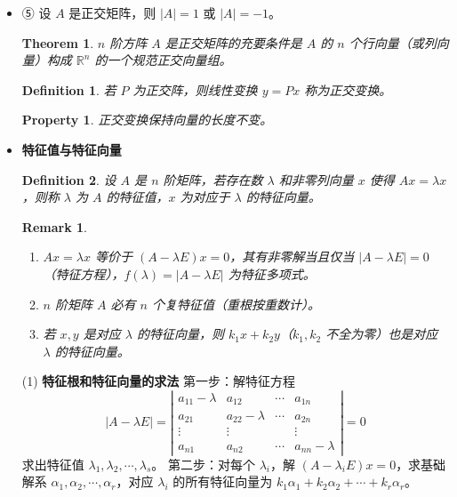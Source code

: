 \documentclass[UTF8]{ctexart}
\newtheorem{theorem}{Theorem}
\newtheorem{definition}{Definition}
\newtheorem{property}{Property}
\newtheorem{remark}{Remark}
\begin{document}
	
	\begin{itemize}
		\item ⑤ 设 \(A\) 是正交矩阵，则 \(|A| = 1\) 或 \(|A| = -1\)。  
		\begin{theorem}
			\(n\) 阶方阵 \(A\) 是正交矩阵的充要条件是 \(A\) 的 \(n\) 个行向量（或列向量）构成 \(\mathbb{R}^n\) 的一个规范正交向量组。
		\end{theorem}
		\begin{definition}
			若 \(P\) 为正交阵，则线性变换 \(y = Px\) 称为正交变换。
		\end{definition}
		\begin{property}
			正交变换保持向量的长度不变。
		\end{property}
		
		\item \textbf{特征值与特征向量}
		\begin{definition}
			设 \(A\) 是 \(n\) 阶矩阵，若存在数 \(\lambda\) 和非零列向量 \(x\) 使得 \(Ax = \lambda x\)，则称 \(\lambda\) 为 \(A\) 的特征值，\(x\) 为对应于 \(\lambda\) 的特征向量。
		\end{definition}
		\begin{remark}
			\begin{enumerate}
				\item \(Ax = \lambda x\) 等价于 \((A - \lambda E)x = 0\)，其有非零解当且仅当 \(|A - \lambda E| = 0\)（特征方程），\(f(\lambda) = |A - \lambda E|\) 为特征多项式。
				\item \(n\) 阶矩阵 \(A\) 必有 \(n\) 个复特征值（重根按重数计）。
				\item 若 \(x, y\) 是对应 \(\lambda\) 的特征向量，则 \(k_1x + k_2y\)（\(k_1, k_2\) 不全为零）也是对应 \(\lambda\) 的特征向量。
			\end{enumerate}
		\end{remark}
		
		(1) \textbf{特征根和特征向量的求法}  
		第一步：解特征方程  
		\[
		|A - \lambda E| = \left|\begin{array}{cccc}
			a_{11} - \lambda & a_{12} & \cdots & a_{1n} \\
			a_{21} & a_{22} - \lambda & \cdots & a_{2n} \\
			\vdots & \vdots & & \vdots \\
			a_{n1} & a_{n2} & \cdots & a_{nn} - \lambda
		\end{array}\right| = 0
		\]  
		求出特征值 \(\lambda_1, \lambda_2, \cdots, \lambda_s\)。  
		第二步：对每个 \(\lambda_i\)，解 \((A - \lambda_i E)x = 0\)，求基础解系 \(\alpha_1, \alpha_2, \cdots, \alpha_r\)，对应 \(\lambda_i\) 的所有特征向量为 \(k_1\alpha_1 + k_2\alpha_2 + \cdots + k_r\alpha_r\)。
		

\end{itemize}
\end{document}
